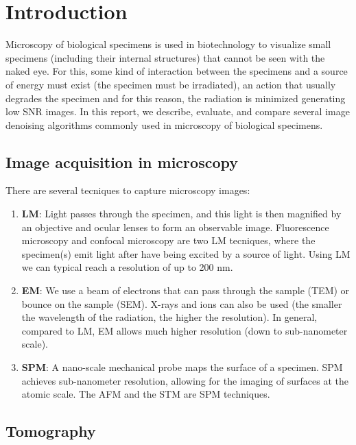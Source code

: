 \chapter{Introduction}

Microscopy of biological specimens is used in biotechnology to
visualize small specimens (including their internal structures) that
cannot be seen with the naked eye. For this, some kind of interaction
between the specimens and a source of energy must exist (the specimen
must be irradiated), an action that usually degrades the specimen and
for this reason, the radiation is minimized generating low SNR
images. In this report, we describe, evaluate, and compare several
image denoising algorithms commonly used in microscopy of biological
specimens.

\section{Image acquisition in microscopy}

There are several tecniques to capture microscopy images:

\begin{enumerate}
  \item \textbf{\gls{LM}}: Light passes through the specimen, and this light
  is then magnified by an objective and ocular lenses to form an
  observable image. Fluorescence microscopy and confocal microscopy
  are two \gls{LM} tecniques, where the specimen(s) emit light after
  have being excited by a source of light. Using \gls{LM} we can
  typical reach a resolution of up to 200 nm.

\item \textbf{\gls{EM}}: We use a beam of electrons that can pass through the
  sample (\gls{TEM}) or bounce on the sample (\gls{SEM}). X-rays and
  ions can also be used (the smaller the wavelength of the radiation,
  the higher the resolution). In general, compared to \gls{LM},
  \gls{EM} allows much higher resolution (down to sub-nanometer
  scale).

\item \textbf{\gls{SPM}}: A nano-scale mechanical probe maps the surface of a
  specimen. \gls{SPM} achieves sub-nanometer resolution, allowing for
  the imaging of surfaces at the atomic scale. The \gls{AFM} and the
  \gls{STM} are \gls{SPM} techniques.
\end{enumerate}
  

\section{Tomography}

